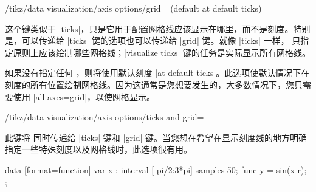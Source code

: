 \begin{key}{/tikz/data visualization/axis options/grid= (default at default ticks)} %

    这个键类似于 |ticks|，只是它用于配置网格线应该显示在哪里，而不是刻度。特别是，可以传递给 |ticks| 键的选项也可以传递给 |grid| 键。就像 |ticks| 一样， 只指定原则上应该绘制哪些网格线；|visualize ticks| 键的任务是实际显示所有网格线。


    如果没有指定任何 ，则将使用默认刻度 |at default ticks|。此选项使默认情况下在刻度的所有位置绘制网格线。因为这通常是您想要发生的，大多数情况下，您只需要使用 |all axes=grid|，以使网格显示。
\end{key}

\begin{key}{/tikz/data visualization/axis options/ticks and grid=} %

    此键将  同时传递给 |ticks| 键和 |grid| 键。当您想在希望在显示刻度线的地方明确指定一些特殊刻度以及网格线时，此选项很有用。
\begin{codeexample}[preamble={\usetikzlibrary{datavisualization.formats.functions}}]
\tikz \datavisualization
  [scientific axes,
   visualize as smooth line,
   all axes= {grid, unit length=1.25cm},
   y axis={ ticks=few },
   x axis={ ticks=many, ticks and grid={ major also at={(pi/2) as $\frac{\pi}{2}$}}}]
  data [format=function] {
    var x : interval [-pi/2:3*pi] samples 50;
    func y = sin(\value x r);
  };
\end{codeexample}
\end{key}


